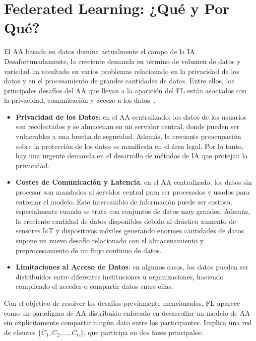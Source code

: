\section{Federated Learning: ¿Qué y Por Qué?}
El \ac{AA} basado en datos domina actualmente el campo de la \ac{IA}. Desafortunadamente, la creciente demanda en término de volumen de datos y variedad ha resultado en varios problemas relacionado en la privacidad de los datos y en el procesamiento de grandes cantidades de datos. Entre ellos, los principales desafíos del \ac{AA} que llevan a la aparición del \ac{FL} están asociados con la privacidad, comunicación y acceso a los datos~\cite{tutorial-nuria}.

\begin{itemize}
    \item \textbf{Privacidad de los Datos}: en el \ac{AA} centralizado, los datos de los usuarios son recolectados y se almacenan en un servidor central, donde pueden ser vulnerables a una brecha de seguridad. Además, la creciente preocupación sobre la protección de los datos se manifiesta en el área legal. Por lo tanto, hay una urgente demanda en el desarrollo de métodos de \ac{IA} que protejan la privacidad.

    \item \textbf{Costes de Comunicación y Latencia}: en el \ac{AA} centralizado, los datos sin procesar son mandados al servidor central para ser procesados y usados para entrenar el modelo. Este intercambio de información puede ser costoso, especialmente cuando se trata con conjuntos de datos muy grandes. Además, la creciente cantidad de datos disponibles debido al drástico aumento de sensores \ac{IoT} y dispositivos móviles generando enormes cantidades de datos supone un nuevo desafío relacionado con el almacenamiento y preprocesamiento de un flujo continuo de datos.

    \item \textbf{Limitaciones al Acceso de Datos}: en algunos casos, los datos pueden ser distribuidos entre diferentes instituciones u organizaciones, haciendo complicado el acceder o compartir datos entre ellas.
\end{itemize}

Con el objetivo de resolver los desafíos previamente mencionados, \ac{FL} aparece como un paradigma de \ac{AA} distribuido enfocado en desarrollar un modelo de \ac{AA} sin explícitamente compartir ningún dato entre los participantes. Implica una red de clientes $\{C_1, C_2, \ldots, C_n \}$, que participa en dos fases principales:

